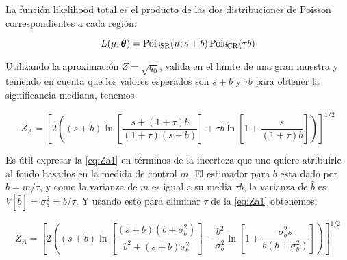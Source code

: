 La función likelihood total es el producto de las dos distribuciones de Poisson
correspondientes a cada región:

\begin{equation}
  L(\mu, \bm{\theta}) = \operatorname{Pois}_\text{SR}(n;s+b) \operatorname{Pois}_\text{CR}(\tau b)
\end{equation}

Utilizando la aproximación $Z = \sqrt{q_0}$, valida en el limite de una gran
muestra y teniendo en cuenta que los valores esperados son $s+b$ y $\tau b$ para
obtener la significancia mediana, tenemos

\begin{equation}
  Z_A = \left[ 2 \left( (s+b) \ln \left[ \frac{s+(1+\tau)b}{(1+\tau)(s+b)}
      \right] + \tau b \ln \left[ 1 + \frac{s}{(1+\tau)b} \right] \right)
    \right]^{1/2}
  \label{eq:Za1}
\end{equation}

Es útil expresar la {\eq} \eqref{eq:Za1} en términos de la incerteza que uno
quiere atribuirle al fondo basados en la medida de control $m$. El estimador
para $b$ esta dado por $\hat{b} = m/\tau$, y como la varianza de $m$ es igual a
su media $\tau b$, la varianza de $\hat{b}$ es $V[\hat{b}] = \sigma_b^2 =
b/\tau$. Y usando esto para eliminar $\tau$ de la {\eq} \eqref{eq:Za1}
obtenemos:

\begin{equation}
  Z_A = \left[ 2 \left( (s+b) \ln \left[
      \frac{(s+b)(b+\sigma_b^2)}{b^2+(s+b)\sigma_b^2} \right] -
    \frac{b^2}{\sigma_b^2} \ln \left[ 1 + \frac{\sigma_b^2 s}{b(b+\sigma_b^2)}
      \right] \right) \right]^{1/2}
  \label{eq:Za}
\end{equation}





